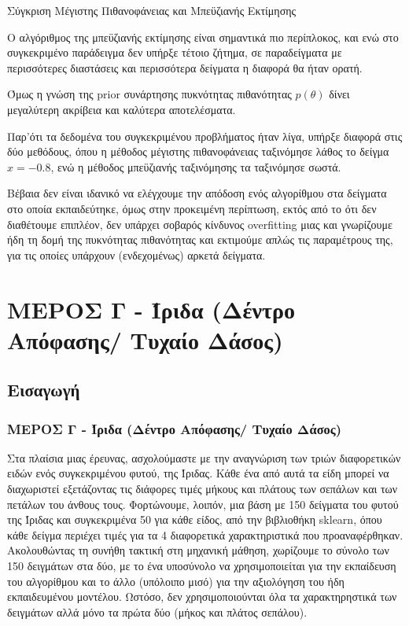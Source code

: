 \documentclass{beamer}
\newcommand{\gr}{\selectlanguage{greek}}
\newcommand{\en}{\selectlanguage{english}}
\begin{document}
\begin{frame}{Σύγκριση Μέγιστης Πιθανοφάνειας και Μπεϋζιανής Εκτίμησης}
\small

Ο αλγόριθμος της μπεϋζιανής εκτίμησης είναι σημαντικά πιο περίπλοκος, και ενώ στο συγκεκριμένο παράδειγμα δεν υπήρξε τέτοιο 
ζήτημα, σε παραδείγματα με περισσότερες διαστάσεις και περισσότερα δείγματα η διαφορά θα ήταν ορατή. 

Όμως η γνώση της \en prior \gr συνάρτησης πυκνότητας πιθανότητας $p(\theta)$ δίνει μεγαλύτερη ακρίβεια και καλύτερα 
αποτελέσματα. 

Παρ'ότι τα δεδομένα του συγκεκριμένου προβλήματος ήταν λίγα, υπήρξε διαφορά στις δύο μεθόδους, όπου η μέθοδος 
μέγιστης πιθανοφάνειας ταξινόμησε λάθος το δείγμα $x=-0.8$, ενώ η μέθοδος μπεϋζιανής ταξινόμησης τα ταξινόμησε σωστά.

Βέβαια δεν είναι ιδανικό να ελέγχουμε την απόδοση ενός αλγορίθμου στα δείγματα στο οποία εκπαιδεύτηκε, όμως στην προκειμένη 
περίπτωση, εκτός από το ότι δεν διαθέτουμε επιπλέον, δεν υπάρχει σοβαρός κίνδυνος \en overfitting \gr μιας και γνωρίζουμε ήδη τη δομή της πυκνότητας πιθανότητας και εκτιμούμε απλώς τις παραμέτρους της, για τις οποίες υπάρχουν (ενδεχομένως) αρκετά
δείγματα.


\end{frame}



\section{ΜΕΡΟΣ Γ - Ίριδα (Δέντρο Απόφασης/ Τυχαίο Δάσος)}
\subsection{Εισαγωγή}

\begin{frame}
    \frametitle{ΜΕΡΟΣ Γ - Ίριδα (Δέντρο Απόφασης/ Τυχαίο Δάσος)}
    Στα πλαίσια μιας έρευνας, ασχολούμαστε με την αναγνώριση των τριών διαφορετικών ειδών ενός συγκεκριμένου φυτού, της Ίριδας. Κάθε ένα από αυτά τα είδη μπορεί να διαχωριστεί εξετάζοντας τις διάφορες τιμές μήκους και πλάτους των σεπάλων και των πετάλων του άνθους τους. Φορτώνουμε, λοιπόν, μια βάση με 150 δείγματα του φυτού της Ίριδας και συγκεκριμένα 50 για κάθε είδος, από την βιβλιοθήκη  sklearn, όπου κάθε δείγμα περιέχει τιμές για τα 4 διαφορετικά χαρακτηριστικά που προαναφέρθηκαν. Ακολουθώντας τη συνήθη τακτική στη μηχανική μάθηση, χωρίζουμε το σύνολο των 150 δειγμάτων στα δύο, με το ένα υποσύνολο να χρησιμοποιείται για την εκπαίδευση του αλγορίθμου και το άλλο (υπόλοιπο μισό) για την αξιολόγηση του ήδη εκπαιδευμένου μοντέλου. Ωστόσο, δεν χρησιμοποιούνται όλα τα χαρακτηρηστικά των δειγμάτων αλλά μόνο τα πρώτα δύο (μήκος και πλάτος σεπάλου).
\end{frame}
\end{document}
